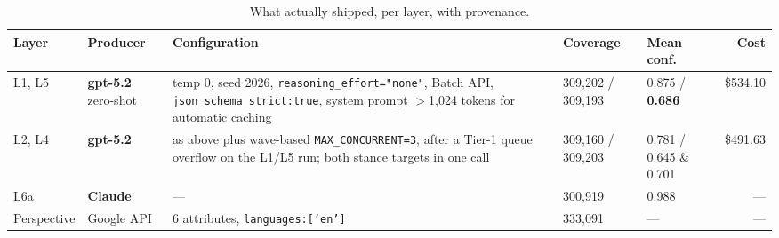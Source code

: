 \begin{table}[h]
  \caption{What actually shipped, per layer, with provenance.}
  \label{tab:production}
  \footnotesize
  \begin{tabular}{@{}llp{4.5cm}llr@{}}
    \toprule
    Layer & Producer & Configuration & Coverage & Mean conf. & Cost \\
    \midrule
    L1, L5 & \textbf{gpt-5.2} zero-shot & temp 0, seed 2026,
      \texttt{reasoning\_effort="none"}, Batch API,
      \texttt{json\_schema strict:true}, system prompt $>$1{,}024 tokens for
      automatic caching & 309{,}202 / 309{,}193 & 0.875 / \textbf{0.686} & \$534.10 \\
    L2, L4 & \textbf{gpt-5.2} & as above plus wave-based
      \texttt{MAX\_CONCURRENT=3}, after a Tier-1 queue overflow on the L1/L5 run;
      both stance targets in one call & 309{,}160 / 309{,}203 & 0.781 / 0.645 \& 0.701 & \$491.63 \\
    L6a & \textbf{Claude} & --- & 300{,}919 & 0.988 & --- \\
    Perspective & Google API & 6 attributes, \texttt{languages:['en']} & 333{,}091 & --- & --- \\
    \bottomrule
  \end{tabular}
\end{table}
